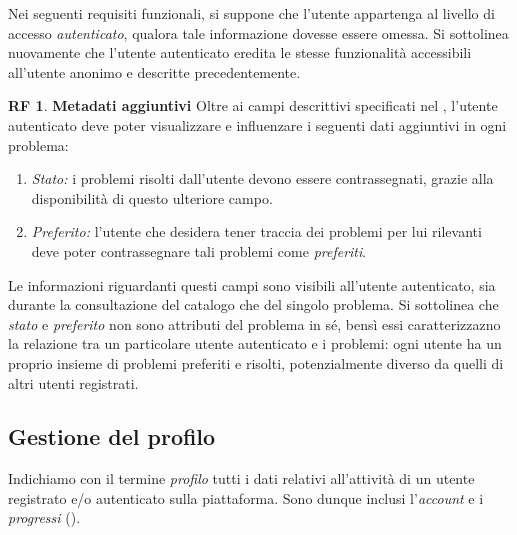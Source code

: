 \documentclass[11pt, a4paper]{article}
\theoremstyle{definition}
\newtheorem{funcreq}{RF} %
\begin{document}
Nei seguenti requisiti funzionali, si suppone che l'utente appartenga al livello
di accesso \textit{autenticato}, qualora tale informazione dovesse essere omessa.
Si sottolinea nuovamente che l'utente autenticato eredita le stesse funzionalità
accessibili all'utente anonimo e descritte precedentemente.
\\
\begin{funcreq}
    \textbf{Metadati aggiuntivi }
    Oltre ai campi descrittivi specificati nel \textcolor{blue}{},
    l'utente autenticato deve poter visualizzare e influenzare i seguenti dati aggiuntivi in
    ogni problema:
    \begin{enumerate}
        \item \textit{Stato:} i problemi risolti dall'utente devono essere contrassegnati,
        grazie alla disponibilità di questo ulteriore campo.
    
        \item \textit{Preferito:} l'utente che desidera tener traccia dei problemi
        per lui rilevanti deve poter contrassegnare tali problemi come \textit{preferiti}.
    \end{enumerate}
    Le informazioni riguardanti questi campi sono visibili all'utente autenticato,
    sia durante la consultazione del catalogo che del singolo problema. Si sottolinea
    che \textit{stato} e \textit{preferito} non sono attributi del problema in sé,
    bensì essi caratterizzazno la relazione tra un particolare utente autenticato e i
    problemi: ogni utente ha un proprio insieme di problemi preferiti e risolti,
    potenzialmente diverso da quelli di altri utenti registrati.
\end{funcreq}

\subsection{Gestione del profilo}
Indichiamo con il termine \textit{profilo} tutti i dati relativi all'attività
di un utente registrato e/o autenticato sulla piattaforma. Sono dunque inclusi
l'\textit{account} e i \textit{progressi} (\textcolor{blue}{}).
\end{document}

